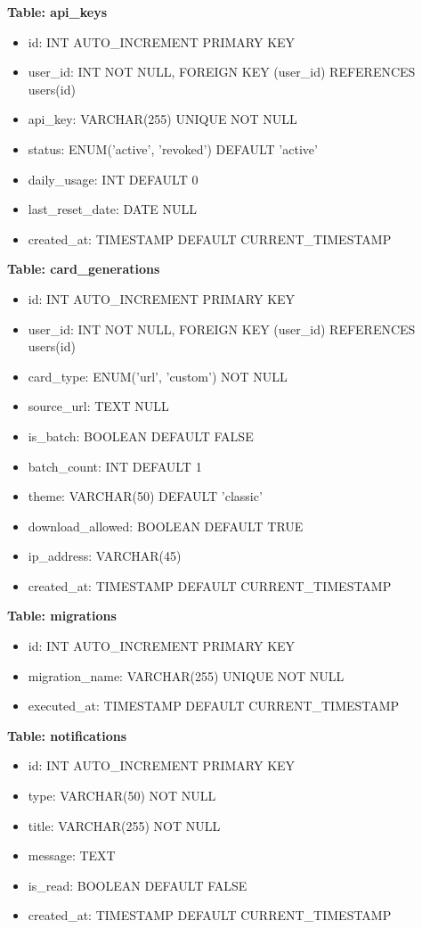 \documentclass[12pt,a4paper]{article}
\begin{document}
\textbf{Table: api\_keys}
\begin{itemize}
    \item id: INT AUTO\_INCREMENT PRIMARY KEY
    \item user\_id: INT NOT NULL, FOREIGN KEY (user\_id) REFERENCES users(id)
    \item api\_key: VARCHAR(255) UNIQUE NOT NULL
    \item status: ENUM('active', 'revoked') DEFAULT 'active'
    \item daily\_usage: INT DEFAULT 0
    \item last\_reset\_date: DATE NULL
    \item created\_at: TIMESTAMP DEFAULT CURRENT\_TIMESTAMP
\end{itemize}

\textbf{Table: card\_generations}
\begin{itemize}
    \item id: INT AUTO\_INCREMENT PRIMARY KEY
    \item user\_id: INT NOT NULL, FOREIGN KEY (user\_id) REFERENCES users(id)
    \item card\_type: ENUM('url', 'custom') NOT NULL
    \item source\_url: TEXT NULL
    \item is\_batch: BOOLEAN DEFAULT FALSE
    \item batch\_count: INT DEFAULT 1
    \item theme: VARCHAR(50) DEFAULT 'classic'
    \item download\_allowed: BOOLEAN DEFAULT TRUE
    \item ip\_address: VARCHAR(45)
    \item created\_at: TIMESTAMP DEFAULT CURRENT\_TIMESTAMP
\end{itemize}

\textbf{Table: migrations}
\begin{itemize}
    \item id: INT AUTO\_INCREMENT PRIMARY KEY
    \item migration\_name: VARCHAR(255) UNIQUE NOT NULL
    \item executed\_at: TIMESTAMP DEFAULT CURRENT\_TIMESTAMP
\end{itemize}

\textbf{Table: notifications}
\begin{itemize}
    \item id: INT AUTO\_INCREMENT PRIMARY KEY
    \item type: VARCHAR(50) NOT NULL
    \item title: VARCHAR(255) NOT NULL
    \item message: TEXT
    \item is\_read: BOOLEAN DEFAULT FALSE
    \item created\_at: TIMESTAMP DEFAULT CURRENT\_TIMESTAMP
\end{itemize}
\end{document}
